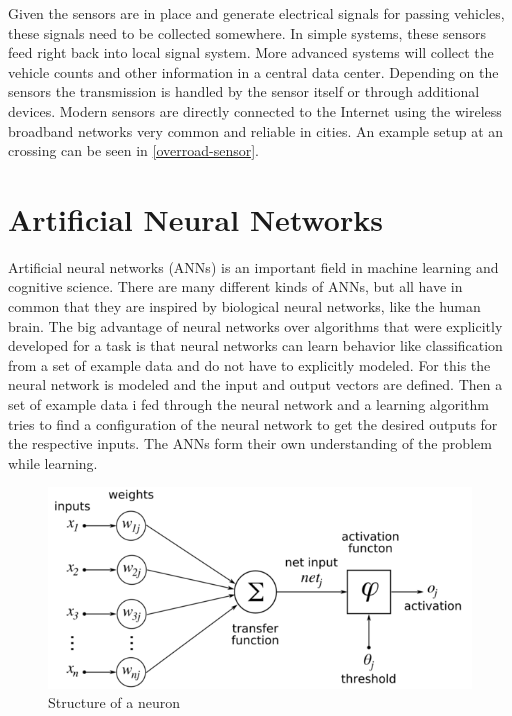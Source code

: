 Given the sensors are in place and generate electrical signals for passing vehicles, these signals need to be collected somewhere. In simple systems, these sensors feed right back into local signal system. More advanced systems will collect the vehicle counts and other information in a central data center. Depending on the sensors the transmission is handled by the sensor itself or through additional devices. Modern sensors are directly connected to the Internet using the wireless broadband networks very common and reliable in cities. An example setup at an crossing can be seen in \autoref{overroad-sensor}.

\section{Artificial Neural Networks}

Artificial neural networks (ANNs) is an important field in machine learning and cognitive science. There are many different kinds of ANNs, but all have in common that they are inspired by biological neural networks, like the human brain. The big advantage of neural networks over algorithms that were explicitly developed for a task is that neural networks can learn behavior like classification from a set of example data and do not have to explicitly modeled. For this the neural network is modeled and the input and output vectors are defined. Then a set of example data i fed through the neural network and a learning algorithm tries to find a configuration of the neural network to get the desired outputs for the respective inputs. The ANNs form their own understanding of the problem while learning.

\begin{figure}[ht]
	\centering
  \includegraphics[scale=0.65]{figures/neuron_structure.png}
	\caption[Structure of a neuron]{Structure of a neuron \protect\footnotemark}
	\label{neuron}
\end{figure}

